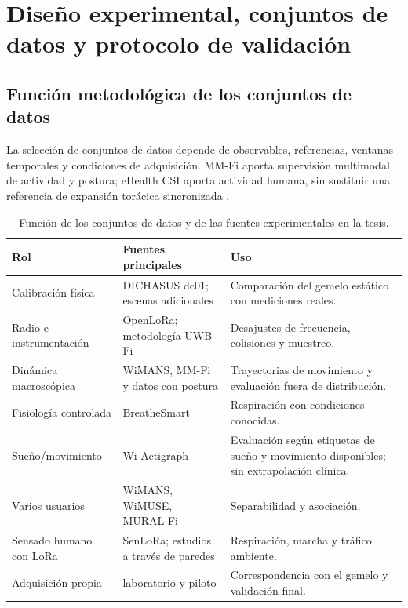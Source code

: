 \chapter{Diseño experimental, conjuntos de datos y protocolo de validación}
\label{ch:experimental_design}

\section{Función metodológica de los conjuntos de datos}

La selección de conjuntos de datos depende de observables, referencias,
ventanas temporales y condiciones de adquisición. MM-Fi aporta supervisión
multimodal de actividad y postura; eHealth CSI aporta actividad humana,
sin sustituir una referencia de expansión torácica sincronizada
\citep{Yang2023MMFi,Galdino2023eHealth}.

\begin{table}[ht]
\centering
\caption{Función de los conjuntos de datos y de las fuentes experimentales en la tesis.}
\begin{tabularx}{\textwidth}{p{4.0cm}L L}
\toprule
\textbf{Rol} & \textbf{Fuentes principales} & \textbf{Uso}\\
\midrule
Calibración física & DICHASUS dc01; escenas adicionales & Comparación del gemelo estático con mediciones reales.\\
Radio e instrumentación & OpenLoRa; metodología UWB-Fi & Desajustes de frecuencia, colisiones y muestreo.\\
Dinámica macroscópica & WiMANS, MM-Fi y datos con postura & Trayectorias de movimiento y evaluación fuera de distribución.\\
Fisiología controlada & BreatheSmart & Respiración con condiciones conocidas.\\
Sueño/movimiento & Wi-Actigraph & Evaluación según etiquetas de sueño y movimiento disponibles; sin extrapolación clínica.\\
Varios usuarios & WiMANS, WiMUSE, MURAL-Fi & Separabilidad y asociación.\\
Sensado humano con LoRa & SenLoRa; estudios a través de paredes & Respiración, marcha y tráfico ambiente.\\
Adquisición propia & laboratorio y piloto & Correspondencia con el gemelo y validación final.\\
\bottomrule
\end{tabularx}
\end{table}

